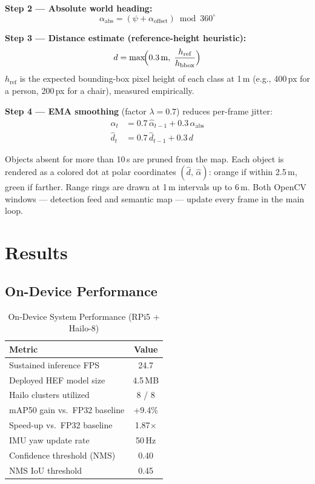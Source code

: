 \documentclass[journal, onecolumn]{IEEEtran}
\begin{document}
\textbf{Step 2 — Absolute world heading:}
\begin{equation}
  \alpha_\text{abs} = (\psi + \alpha_\text{offset}) \bmod 360^\circ
\end{equation}

\textbf{Step 3 — Distance estimate (reference-height heuristic):}
\begin{equation}
  d = \max\!\Bigl(0.3\,\text{m},\;\frac{h_\text{ref}}{h_\text{bbox}}\Bigr)
  \label{eq:dist}
\end{equation}
$h_\text{ref}$ is the expected bounding-box pixel height of each class at 1\,m (e.g., 400\,px for a person, 200\,px for a chair), measured empirically.

\textbf{Step 4 — EMA smoothing} (factor $\lambda = 0.7$) reduces per-frame jitter:
\begin{align}
  \hat{\alpha}_t &= 0.7\,\hat{\alpha}_{t-1} + 0.3\,\alpha_\text{abs} \\
  \hat{d}_t      &= 0.7\,\hat{d}_{t-1}      + 0.3\,d
\end{align}

Objects absent for more than 10\,s are pruned from the map. Each object is rendered as a colored dot at polar coordinates $(\hat{d},\,\hat{\alpha})$: orange if within 2.5\,m, green if farther. Range rings are drawn at 1\,m intervals up to 6\,m. Both OpenCV windows — detection feed and semantic map — update every frame in the main loop.

\section{Results}
\label{sec:results}

\subsection{On-Device Performance}

\begin{table}[H]
\centering
\caption{On-Device System Performance (RPi5 + Hailo-8)}
\label{tab:perf}
\begin{tabular}{lc}
\toprule
\textbf{Metric} & \textbf{Value} \\
\midrule
Sustained inference FPS & 24.7 \\
Deployed HEF model size & 4.5\,MB \\
Hailo clusters utilized & 8 / 8 \\
mAP50 gain vs.\ FP32 baseline & +9.4\% \\
Speed-up vs.\ FP32 baseline & 1.87$\times$ \\
IMU yaw update rate & 50\,Hz \\
Confidence threshold (NMS) & 0.40 \\
NMS IoU threshold & 0.45 \\
\bottomrule
\end{tabular}
\end{table}
\end{document}
